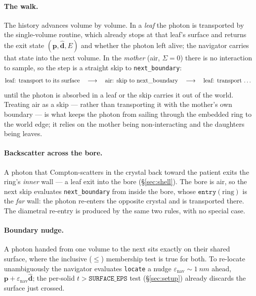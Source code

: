 \documentclass[11pt]{article}
\newcommand{\dvec}{\hat{\mathbf{d}}}
\begin{document}
\paragraph{The walk.}
The history advances volume by volume. In a \emph{leaf} the photon is transported by the
single-volume routine, which already stops at that leaf's surface and returns the exit
state $(\mathbf{p},\dvec,E)$ and whether the photon left alive; the navigator carries
that state into the next volume. In the \emph{mother} (air, $\Sigma=0$) there is no
interaction to sample, so the step is a straight skip to \texttt{next\_boundary}:
\begin{equation}
  \text{leaf: transport to its surface} \quad\longrightarrow\quad
  \text{air: skip to next\_boundary} \quad\longrightarrow\quad
  \text{leaf: transport \dots}
\end{equation}
until the photon is absorbed in a leaf or the skip carries it out of the world. Treating
air as a skip --- rather than transporting it with the mother's own boundary --- is what
keeps the photon from sailing through the embedded ring to the world edge; it relies on
the mother being non-interacting and the daughters being leaves.

\paragraph{Backscatter across the bore.}
A photon that Compton-scatters in the crystal back toward the patient exits the ring's
\emph{inner} wall --- a leaf exit into the bore (\S\ref{sec:shell}). The bore is air, so
the next skip evaluates \texttt{next\_boundary} from inside the bore, whose
$\texttt{entry}(\text{ring})$ is the \emph{far} wall: the photon re-enters the opposite
crystal and is transported there. The diametral re-entry is produced by the same two
rules, with no special case.

\paragraph{Boundary nudge.}
A photon handed from one volume to the next sits exactly on their shared surface, where
the inclusive ($\le$) membership test is true for both. To re-locate unambiguously the
navigator evaluates \texttt{locate} a nudge $\varepsilon_{\mathrm{nav}}\sim\SI{1}{nm}$
ahead, $\mathbf{p}+\varepsilon_{\mathrm{nav}}\dvec$; the per-solid $t>\texttt{SURFACE\_EPS}$
test (\S\ref{sec:setup}) already discards the surface just crossed.
\end{document}
